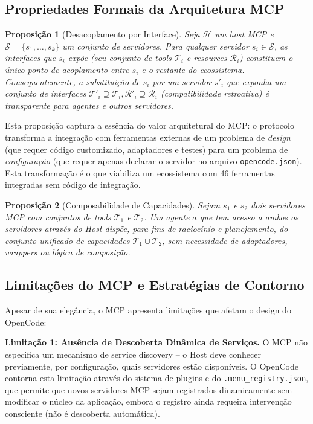 \documentclass[12pt,a4paper,sumario=tradicional,openany]{abntex2}
\newtheorem{proposition}{Proposição}[chapter]
\begin{document}
\subsection{Propriedades Formais da Arquitetura MCP}

\begin{proposition}[Desacoplamento por Interface]
Seja $\mathcal{H}$ um host MCP e $\mathcal{S} = \{s_1, \ldots, s_k\}$ um conjunto de servidores. Para qualquer servidor $s_i \in \mathcal{S}$, as interfaces que $s_i$ expõe (seu conjunto de tools $\mathcal{T}_i$ e resources $\mathcal{R}_i$) constituem o único ponto de acoplamento entre $s_i$ e o restante do ecossistema. Consequentemente, a substituição de $s_i$ por um servidor $s'_i$ que exponha um conjunto de interfaces $\mathcal{T}'_i \supseteq \mathcal{T}_i, \mathcal{R}'_i \supseteq \mathcal{R}_i$ (compatibilidade retroativa) é transparente para agentes e outros servidores.
\end{proposition}

Esta proposição captura a essência do valor arquitetural do MCP: o protocolo transforma a integração com ferramentas externas de um problema de \textit{design} (que requer código customizado, adaptadores e testes) para um problema de \textit{configuração} (que requer apenas declarar o servidor no arquivo \texttt{opencode.json}). Esta transformação é o que viabiliza um ecossistema com 46 ferramentas integradas sem código de integração.

\begin{proposition}[Composabilidade de Capacidades]
Sejam $s_1$ e $s_2$ dois servidores MCP com conjuntos de tools $\mathcal{T}_1$ e $\mathcal{T}_2$. Um agente $a$ que tem acesso a ambos os servidores através do Host dispõe, para fins de raciocínio e planejamento, do conjunto unificado de capacidades $\mathcal{T}_1 \cup \mathcal{T}_2$, sem necessidade de adaptadores, wrappers ou lógica de composição.
\end{proposition}

\subsection{Limitações do MCP e Estratégias de Contorno}

Apesar de sua elegância, o MCP apresenta limitações que afetam o design do OpenCode:

\textbf{Limitação 1: Ausência de Descoberta Dinâmica de Serviços.} O MCP não especifica um mecanismo de service discovery -- o Host deve conhecer previamente, por configuração, quais servidores estão disponíveis. O OpenCode contorna esta limitação através do sistema de plugins e do \texttt{.menu\_registry.json}, que permite que novos servidores MCP sejam registrados dinamicamente sem modificar o núcleo da aplicação, embora o registro ainda requeira intervenção consciente (não é descoberta automática).
\end{document}
